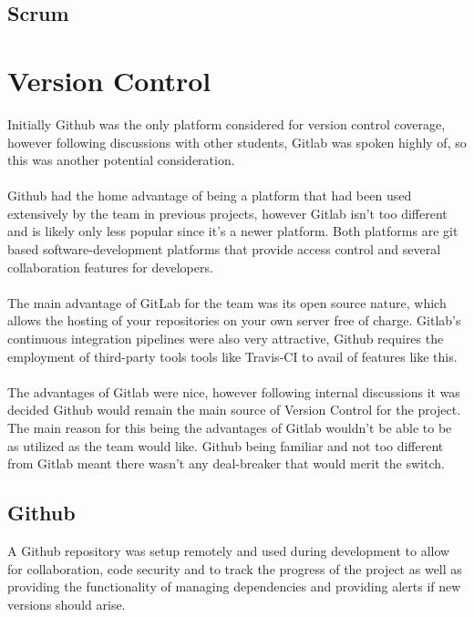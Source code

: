\subsection{Scrum}

\section{Version Control}
Initially Github \cite{GITHUB} was the only platform considered for version control coverage, however following discussions with other students, Gitlab \cite{GITLAB} was spoken highly of, so this was another potential consideration. 

\paragraph{}
Github had the home advantage of being a platform that had been used extensively by the team in previous projects, however Gitlab isn't too different and is likely only less popular since it's a newer platform. Both platforms are git based software-development platforms that provide access control and several collaboration features for developers. 

\paragraph{}
The main advantage of GitLab for the team was its open source nature, which allows the hosting of your repositories on your own server free of charge. Gitlab's continuous integration pipelines were also very attractive, Github requires the employment of third-party tools tools like Travis-CI to avail of features like this.

\paragraph{}
The advantages of Gitlab were nice, however following internal discussions it was decided Github would remain the main source of Version Control for the project. The main reason for this being the advantages of Gitlab wouldn't be able to be as utilized as the team would like. Github being familiar and not too different from Gitlab meant there wasn't any deal-breaker that would merit the switch.

\subsection{Github}
A Github repository was setup remotely and used during development to allow for collaboration, code security and to track the progress of the project as well as providing the functionality of managing dependencies and providing alerts if new versions should arise. 


